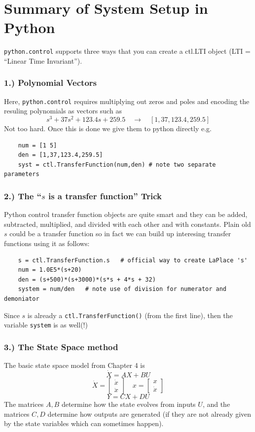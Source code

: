 \clearpage
\section{Summary of System Setup in Python}
{\tt python.control} supports three ways that you can create a ctl.LTI object (LTI = ``Linear Time Invariant'').

\subsubsection{1.) Polynomial Vectors}
Here, {\tt python.control} requires multiplying out zeros and  poles and encoding
the resuling polynomials as vectors such as
\[
s^3 + 37s^2 + 123.4s + 259.5 \quad \to \quad [1, 37, 123.4, 259.5]
\]
Not too hard.  Once this is done we give them to python directly e.g.

\begin{verbatim}
    num = [1 5]
    den = [1,37,123.4,259.5]
    syst = ctl.TransferFunction(num,den) # note two separate parameters
\end{verbatim}

\subsubsection{2.) The ``$s$ is a transfer function'' Trick}
Python control transfer function objects are quite smart and they can be added,
subtracted, multiplied, and divided with each other and with constants.
Plain old $s$ could be a transfer function so in fact we can build up interesing
transfer functions using it as follows:
\begin{verbatim}
    s = ctl.TransferFunction.s   # official way to create LaPlace 's'
    num = 1.0E5*(s+20)
    den = (s+500)*(s+3000)*(s*s + 4*s + 32)
    system = num/den   # note use of division for numerator and demoniator
\end{verbatim}
Since $s$ is already a {\tt ctl.TransferFunction()}  (from the first line), then
the variable {\tt system} is as well(!)

\subsubsection{3.) The State Space method}
The basic state space model from Chapter 4 is
\[
\dot{X} = AX+BU
\]
\[
\dot{X} = \begin{bmatrix}\dot{x} \\ \ddot{x} \end{bmatrix} \quad
x = \begin{bmatrix} x \\ \dot{x}  \end{bmatrix}
\]
\[
Y = CX+DU
\]
The matrices $A,B$ determine how the state evolves from inputs $U$, and
the matrices $C,D$ determine how outputs are generated (if they are not
already given by the state variables which can sometimes happen).

